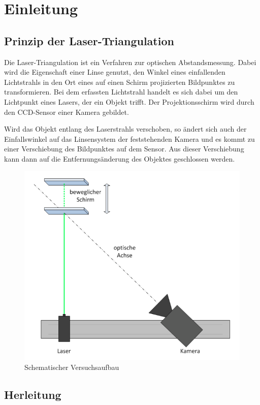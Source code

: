 \section{Einleitung}

\subsection{Prinzip der Laser-Triangulation}

Die Laser-Triangulation ist ein Verfahren zur optischen Abstandsmessung. Dabei wird die Eigenschaft einer Linse genutzt, den Winkel eines einfallenden Lichtstrahls in den Ort eines auf einen Schirm projizierten Bildpunktes zu transformieren. Bei dem erfassten Lichtstrahl handelt es sich dabei um den Lichtpunkt eines Lasers, der ein Objekt trifft. Der Projektionsschirm wird durch den CCD-Sensor einer Kamera gebildet.

Wird das Objekt entlang des Laserstrahls verschoben, so ändert sich auch der Einfallswinkel auf das Linsensystem der feststehenden Kamera und es kommt zu einer Verschiebung des Bildpunktes auf dem Sensor. Aus dieser Verschiebung kann dann auf die Entfernungsänderung des Objektes geschlossen werden.

\begin{figure}[h!]
	\centering
	\includegraphics[width=0.8\linewidth]{img/Lasertriangulation_schema}
	\caption{Schematischer Versuchsaufbau \cite{versuchsanleitung_lasertriangulation}}
	\label{fig:schema_aufbau}
\end{figure}

\subsection{Herleitung}

